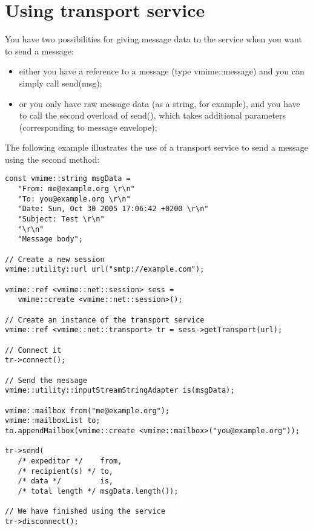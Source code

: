 \section{Using transport service}

You have two possibilities for giving message data to the service when you
want to send a message:

\begin{itemize}
\item either you have a reference to a message (type {\vcode vmime::message})
and you can simply call {\vcode send(msg)};
\item or you only have raw message data (as a string, for example), and you
have to call the second overload of {\vcode send()}, which takes additional
parameters (corresponding to message envelope);
\end{itemize}

The following example illustrates the use of a transport service to send a
message using the second method:

\begin{lstlisting}[caption={Using a transport service}]
const vmime::string msgData =
   "From: me@example.org \r\n"
   "To: you@example.org \r\n"
   "Date: Sun, Oct 30 2005 17:06:42 +0200 \r\n"
   "Subject: Test \r\n"
   "\r\n"
   "Message body";

// Create a new session
vmime::utility::url url("smtp://example.com");

vmime::ref <vmime::net::session> sess =
   vmime::create <vmime::net::session>();

// Create an instance of the transport service
vmime::ref <vmime::net::transport> tr = sess->getTransport(url);

// Connect it
tr->connect();

// Send the message
vmime::utility::inputStreamStringAdapter is(msgData);

vmime::mailbox from("me@example.org");
vmime::mailboxList to;
to.appendMailbox(vmime::create <vmime::mailbox>("you@example.org"));

tr->send(
   /* expeditor */    from,
   /* recipient(s) */ to,
   /* data */         is,
   /* total length */ msgData.length());

// We have finished using the service
tr->disconnect();
\end{lstlisting}


